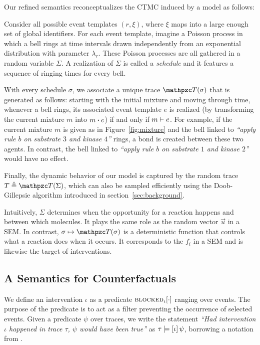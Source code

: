 Our refined semantics reconceptualizes the CTMC induced by a model as
follows:
\begin{inparaenum}[(i)]
\item Consider all possible event templates $(r, \xi)$, where $\xi$
  maps into a large enough set of global identifiers. For each event
  template, imagine a Poisson process in which a bell rings at time
  intervals drawn independently from an exponential distribution with
  parameter $\lambda_r$. These Poisson processes are all gathered in a
  random variable $\Sigma$. A realization of $\Sigma$ is called
  a \emph{schedule} and it features a sequence of ringing times
  for every bell.
\item With every schedule $\sigma$, we associate a unique trace
  $\DetTrace(\sigma)$ that is generated as follows: starting with the
  initial mixture and moving through time, whenever a bell rings, its
  associated event template $e$ is realized (by transforming the
  current mixture $m$ into $\UPDATE{m}{e}$) if and only if
  $m \vdash e$. For example, if the current mixture $m$ is
  given as in Figure~\ref{fig:mixture} and the bell linked to
  \textit{``apply rule $b$ on substrate $3$ and kinase $4$''} rings, a
  bond is created between these two agents. In contrast, the bell
  linked to \textit{``apply rule $b$ on substrate $1$ and kinase
    $2$'}' would have no effect.
\item Finally, the dynamic behavior of our model is captured by the random
  trace $T \eqdef \DetTrace(\Sigma)$, which can also be sampled
  efficiently using the Doob-Gillepsie algorithm introduced in
  section~\ref{sec:background}.
\end{inparaenum}

Intuitively, $\Sigma$ determines when the opportunity for a reaction
happens and between which molecules. It plays the same role as the
random vector $\vec u$ in a SEM. In contrast,
$\sigma \mapsto \DetTrace(\sigma)$ is a deterministic function that
controls what a reaction does when it occurs.  It corresponds to the
$f_i$ in a SEM and is likewise the target of interventions.


\subsection{A Semantics for Counterfactuals}
\label{subsec:counterfactuals-semantics}

We define an intervention $\iota$ as a predicate
${\textsc{blocked}}_{\iota}[\cdot]$ ranging over events. The purpose of the
predicate is to act as a filter preventing the occurrence of selected
events. Given a predicate $\psi$ over traces, we write the statement
\textit{``Had intervention $\iota$ happened in trace $\tau$, $\psi$
  would have been true''} as $\tau \models [\iota] \, \psi{}$, borrowing a notation from
\cite{halpern2016actual}.

